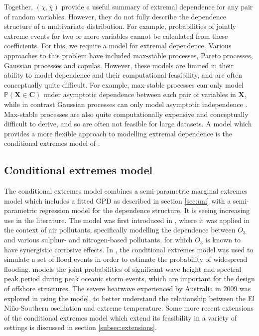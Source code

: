 \documentclass{article}
\numberwithin{equation}{section}
\begin{document}
Together, $(\chi, \bar{\chi})$ provide a useful summary of extremal dependence for any pair of random variables.
However, they do not fully describe the dependence structure of a multivariate distribution.
For example, probabilities of jointly extreme events for two or more variables cannot be calculated from these coefficients.
For this, we require a model for extremal dependence.
Various approaches to this problem have included max-stable processes, Pareto processes, Gaussian processes and copulas.
However, these models are limited in their ability to model dependence and their computational feasibility, and are often conceptually quite difficult. 
For example, max-stable processes can only model $\mathbb{P}(\bm{X} \in \bm{C})$ under asymptotic dependence between each pair of variables in $\bm{X}$, while in contrast Gaussian processes can only model asymptotic independence \citep{Tawn2018, Huser2024}.
Max-stable processes are also quite computationally expensive and conceptually difficult to derive, and so are often not feasible for large datasets.
A model which provides a more flexible approach to modelling extremal dependence is the conditional extremes model of \citet{Heffernan2004}.


\subsection{Conditional extremes model}


The conditional extremes model combines a semi-parametric marginal extremes model which includes a fitted GPD as described in section \ref{sec:uni} with a semi-parametric regression model for the dependence structure. 
It is seeing increasing use in the literature.
The model was first introduced in \citet{Heffernan2004}, where it was applied in the context of air pollutants, specifically modelling the dependence between $O_3$ and various sulphur- and nitrogen-based pollutants, for which $O_3$ is known to have synergistic corrosive effects. %
In \citet{Keef2012_flooding}, the conditional extremes model was used to simulate a set of flood events in order to estimate the probability of widespread flooding. %
\citet{Jonathan2013} models the joint probabilities of significant wave height and spectral peak period during peak oceanic storm events, which are important for the design of offshore structures. 
The severe heatwave experienced by Australia in 2009 was explored in \citet{Winter2016} using the model, to better understand the relationship between the El Niño-Southern oscillation and extreme temperature.
Some more recent extensions of the conditional extremes model which extend its feasibility in a variety of settings is discussed in section \ref{subsec:extensions}.
\end{document}
